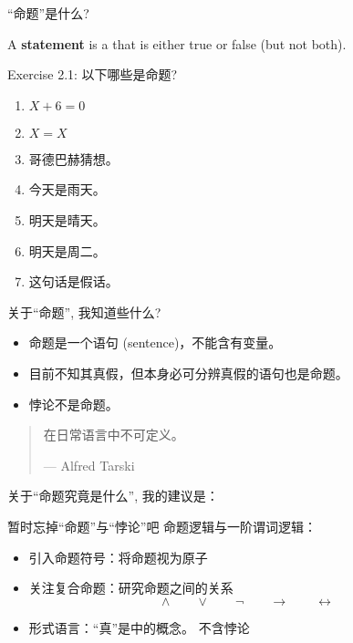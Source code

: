 \begin{frame}{``命题''是什么?}
  \begin{definition}
    A \textbf{statement} is a  that is either true or false
    (but not both).
  \end{definition}

  \vspace{0.30cm}
  \pause
  \begin{exampleblock}{Exercise 2.1: 以下哪些是命题?}
    \begin{enumerate}
      \item $X + 6 = 0$
      \item $X = X$
      \item 哥德巴赫猜想。
      \item 今天是雨天。
      \item 明天是晴天。
      \item 明天是周二。
      \item 这句话是假话。
    \end{enumerate}
  \end{exampleblock}
\end{frame}

\begin{frame}{关于``命题'', 我知道些什么?}
  \begin{itemize}
    \setlength{\itemsep}{6pt}
    \item 命题是一个语句 (sentence)，不能含有变量。
    \item 目前不知其真假，但本身必可分辨真假的语句也是命题。
    \item 悖论不是命题。
  \end{itemize}

  \vspace{0.40cm}
  \begin{quote}
    \centerline{在日常语言中不可定义。} \hfill --- Alfred Tarski
  \end{quote}
\end{frame}

\begin{frame}{关于``命题究竟是什么'', 我的建议是：}
\end{frame}

\begin{frame}{暂时忘掉``命题''与``悖论''吧}
  命题逻辑与一阶谓词逻辑：
  \begin{itemize}
    \item 引入命题符号：将命题视为原子
    \item 关注复合命题：研究命题之间的关系 
      \[
	\land \qquad \lor \qquad \lnot \qquad \to \qquad \leftrightarrow
      \]
    \item 形式语言：``真''是中的概念。 不含悖论
  \end{itemize}
\end{frame}
